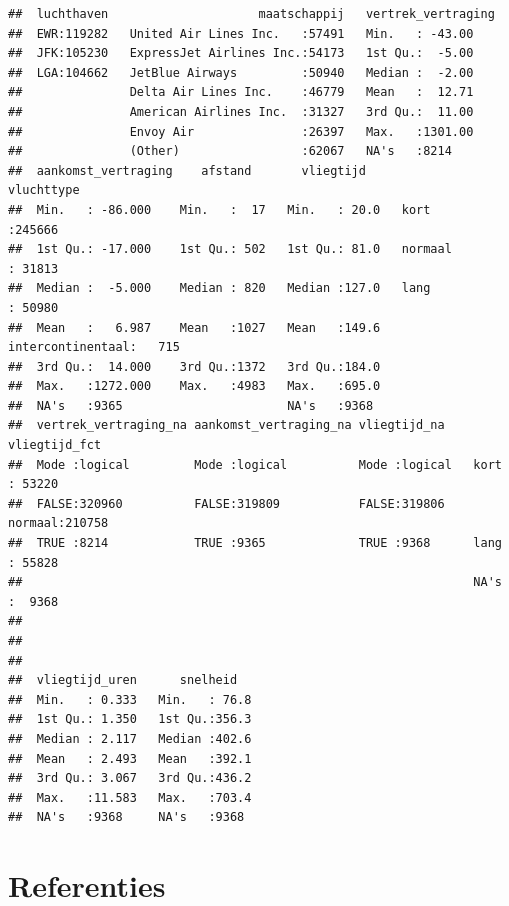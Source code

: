 \documentclass[]{tufte-book}
\begin{document}
\begin{verbatim}
##  luchthaven                     maatschappij   vertrek_vertraging
##  EWR:119282   United Air Lines Inc.   :57491   Min.   : -43.00   
##  JFK:105230   ExpressJet Airlines Inc.:54173   1st Qu.:  -5.00   
##  LGA:104662   JetBlue Airways         :50940   Median :  -2.00   
##               Delta Air Lines Inc.    :46779   Mean   :  12.71   
##               American Airlines Inc.  :31327   3rd Qu.:  11.00   
##               Envoy Air               :26397   Max.   :1301.00   
##               (Other)                 :62067   NA's   :8214      
##  aankomst_vertraging    afstand       vliegtijd                 vluchttype    
##  Min.   : -86.000    Min.   :  17   Min.   : 20.0   kort             :245666  
##  1st Qu.: -17.000    1st Qu.: 502   1st Qu.: 81.0   normaal          : 31813  
##  Median :  -5.000    Median : 820   Median :127.0   lang             : 50980  
##  Mean   :   6.987    Mean   :1027   Mean   :149.6   intercontinentaal:   715  
##  3rd Qu.:  14.000    3rd Qu.:1372   3rd Qu.:184.0                             
##  Max.   :1272.000    Max.   :4983   Max.   :695.0                             
##  NA's   :9365                       NA's   :9368                              
##  vertrek_vertraging_na aankomst_vertraging_na vliegtijd_na    vliegtijd_fct   
##  Mode :logical         Mode :logical          Mode :logical   kort   : 53220  
##  FALSE:320960          FALSE:319809           FALSE:319806    normaal:210758  
##  TRUE :8214            TRUE :9365             TRUE :9368      lang   : 55828  
##                                                               NA's   :  9368  
##                                                                               
##                                                                               
##                                                                               
##  vliegtijd_uren      snelheid    
##  Min.   : 0.333   Min.   : 76.8  
##  1st Qu.: 1.350   1st Qu.:356.3  
##  Median : 2.117   Median :402.6  
##  Mean   : 2.493   Mean   :392.1  
##  3rd Qu.: 3.067   3rd Qu.:436.2  
##  Max.   :11.583   Max.   :703.4  
##  NA's   :9368     NA's   :9368
\end{verbatim}

\hypertarget{referenties-3}{%
\section*{Referenties}\label{referenties-3}}
\end{document}
